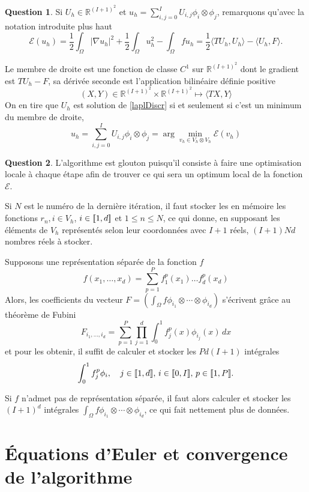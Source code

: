 \documentclass[11pt]{article}
\newcommand{\RR}{\mathbb{R}}
\DeclarePairedDelimiter{\zintcc}{[\![}{]\!]}
\theoremstyle{definition}
\newtheorem{ques}{Question}
\begin{document}
\begin{ques}
Si $U_h\in \RR^{(I+1)^2}$ et $u_h = \sum_{i,j=0}^I U_{i,j}\phi_i\otimes\phi_j$, remarquons qu'avec la notation introduite plus haut
\[
\mathcal{E}(u_h) = \frac 12\int_\Omega |\nabla u_h|^2 + \frac 12\int_\Omega u_h^2 - \int_\Omega fu_h = \frac 12\langle TU_h,U_h\rangle - \langle U_h,F\rangle.
\]

Le membre de droite est une fonction de classe $C^1$ sur $\RR^{(I+1)^2}$ dont le gradient est $TU_h - F$, sa dérivée seconde est l'application bilinéaire définie positive
\[
(X,Y)\in \RR^{(I+1)^2}\times \RR^{(I+1)^2} \longmapsto \langle TX,Y\rangle
\]
On en tire que $U_h$ est solution de \eqref{laplDiscr} si et seulement si c'est un minimum du membre de droite, 
\begin{equation}
u_h = \sum_{i,j=0}^I U_{i,j}\phi_i\otimes\phi_j = \arg\min_{v_h\in V_h\otimes V_h}\mathcal{E}(v_h)
\end{equation}
\end{ques}


\begin{ques}
L'algorithme est glouton puisqu'il consiste à faire une optimisation locale à chaque étape afin de trouver ce qui sera un optimum local de la fonction $\mathcal E$.

Si $N$ est le numéro de la dernière itération, il faut stocker les en mémoire les fonctions $r_n,i\in V_h$, $i\in\zintcc{1,d}$ et $1\leq n\leq N$, ce qui donne, en supposant les éléments de $V_h$ représentés selon leur coordonnées avec $I+1$ réels, $(I+1)Nd$ nombres réels à stocker.

Supposons une représentation séparée de la fonction $f$
\[
f(x_1,\ldots,x_d) = \sum_{p=1}^{P} f_1^p(x_1)\ldots f_d^p(x_d)
\]
Alors, les coefficients du vecteur $F = (\int_\Omega f\phi_{i_1}\otimes\cdots\otimes\phi_{i_d})$ s'écrivent grâce au théorème de Fubini
\[
F_{i_1,\ldots,i_d} = \sum_{p=1}^P\prod_{j=1}^{d}\int_0^1 f_j^p(x)\phi_{i_j}(x)\,dx
\]
et pour les obtenir, il suffit de calculer et stocker les $Pd(I+1)$ intégrales
\[
\int_0^1 f_j^p\phi_i,\quad j\in\zintcc{1,d},\,i\in\zintcc{0,I},\,p\in\zintcc{1,P}.
\]

Si $f$ n'admet pas de représentation séparée, il faut alors calculer et stocker les $(I+1)^d$ intégrales $\int_\Omega f\phi_{i_1}\otimes\cdots\otimes\phi_{i_d}$, ce qui fait nettement plus de données.
\end{ques}

\section{Équations d'Euler et convergence de l'algorithme}
\end{document}
